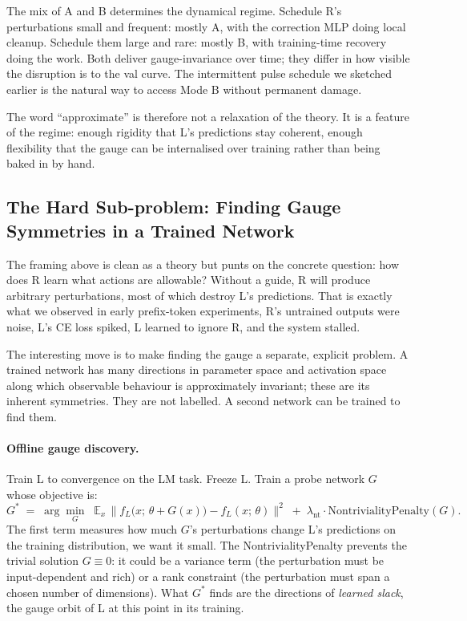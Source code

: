 \documentclass[11pt, a4paper]{article}
\theoremstyle{plain}
\theoremstyle{definition}
\theoremstyle{remark}
\begin{document}
The mix of A and B determines the dynamical regime.
Schedule R's perturbations small and frequent: mostly A, with the correction MLP doing local cleanup.
Schedule them large and rare: mostly B, with training-time recovery doing the work.
Both deliver gauge-invariance over time; they differ in how visible the disruption is to the val curve.
The intermittent pulse schedule we sketched earlier is the natural way to access Mode B without permanent damage.

The word ``approximate'' is therefore not a relaxation of the theory.
It is a feature of the regime: enough rigidity that L's predictions stay coherent, enough flexibility that the gauge can be internalised over training rather than being baked in by hand.

\subsection{The Hard Sub-problem: Finding Gauge Symmetries in a Trained Network}

The framing above is clean as a theory but punts on the concrete question: how does R learn what actions are allowable?
Without a guide, R will produce arbitrary perturbations, most of which destroy L's predictions.
That is exactly what we observed in early prefix-token experiments, R's untrained outputs were noise, L's CE loss spiked, L learned to ignore R, and the system stalled.

The interesting move is to make finding the gauge a separate, explicit problem.
A trained network has many directions in parameter space and activation space along which observable behaviour is approximately invariant; these are its inherent symmetries.
They are not labelled.
A second network can be trained to find them.

\paragraph{Offline gauge discovery.}
Train L to convergence on the LM task. Freeze L. Train a probe network $G$ whose objective is:
\begin{equation}
G^{*} \;=\; \arg\min_{G} \;\; \mathbb{E}_x \,\big\| f_L\!\big(x;\, \theta + G(x)\big) - f_L(x;\, \theta) \big\|^2
\;+\; \lambda_{\text{nt}} \cdot \mathrm{NontrivialityPenalty}(G).
\end{equation}
The first term measures how much $G$'s perturbations change L's predictions on the training distribution, we want it small.
The NontrivialityPenalty prevents the trivial solution $G \equiv 0$: it could be a variance term (the perturbation must be input-dependent and rich) or a rank constraint (the perturbation must span a chosen number of dimensions).
What $G^{*}$ finds are the directions of \emph{learned slack}, the gauge orbit of L at this point in its training.
\end{document}
